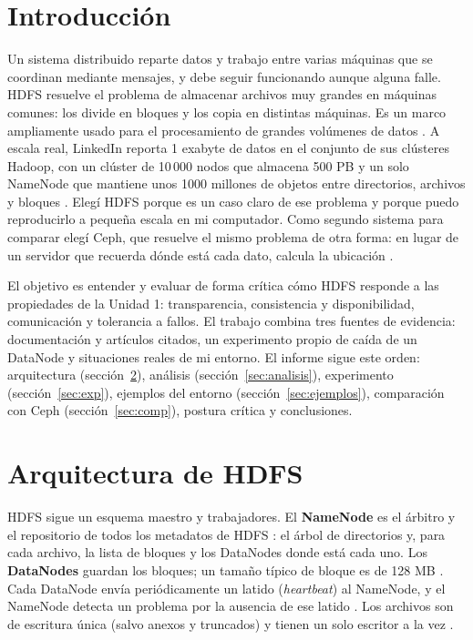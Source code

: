 \documentclass[11pt,a4paper]{article}
\begin{document}
\newpage
\section{Introducción}
Un sistema distribuido reparte datos y trabajo entre varias máquinas que se coordinan mediante mensajes, y debe seguir funcionando aunque alguna falle. HDFS resuelve el problema de almacenar archivos muy grandes en máquinas comunes: los divide en bloques y los copia en distintas máquinas. Es un marco ampliamente usado para el procesamiento de grandes volúmenes de datos \cite{Dhulavvagol2023}. A escala real, LinkedIn reporta 1 exabyte de datos en el conjunto de sus clústeres Hadoop, con un clúster de 10\,000 nodos que almacena 500 PB y un solo NameNode que mantiene unos 1000 millones de objetos entre directorios, archivos y bloques \cite{LinkedIn2021}. Elegí HDFS porque es un caso claro de ese problema y porque puedo reproducirlo a pequeña escala en mi computador. Como segundo sistema para comparar elegí Ceph, que resuelve el mismo problema de otra forma: en lugar de un servidor que recuerda dónde está cada dato, calcula la ubicación \cite{CephArchitecture}.

El objetivo es entender y evaluar de forma crítica cómo HDFS responde a las propiedades de la Unidad 1: transparencia, consistencia y disponibilidad, comunicación y tolerancia a fallos. El trabajo combina tres fuentes de evidencia: documentación y artículos citados, un experimento propio de caída de un DataNode y situaciones reales de mi entorno. El informe sigue este orden: arquitectura (sección~\ref{sec:arq}), análisis (sección~\ref{sec:analisis}), experimento (sección~\ref{sec:exp}), ejemplos del entorno (sección~\ref{sec:ejemplos}), comparación con Ceph (sección~\ref{sec:comp}), postura crítica y conclusiones.

\section{Arquitectura de HDFS}\label{sec:arq}
HDFS sigue un esquema maestro y trabajadores. El \textbf{NameNode} es el árbitro y el repositorio de todos los metadatos de HDFS \cite{HadoopHDFSDesign}: el árbol de directorios y, para cada archivo, la lista de bloques y los DataNodes donde está cada uno. Los \textbf{DataNodes} guardan los bloques; un tamaño típico de bloque es de 128 MB \cite{HadoopHDFSDesign}. Cada DataNode envía periódicamente un latido (\emph{heartbeat}) al NameNode, y el NameNode detecta un problema por la ausencia de ese latido \cite{HadoopHDFSDesign}. Los archivos son de escritura única (salvo anexos y truncados) y tienen un solo escritor a la vez \cite{HadoopHDFSDesign}.
\end{document}
